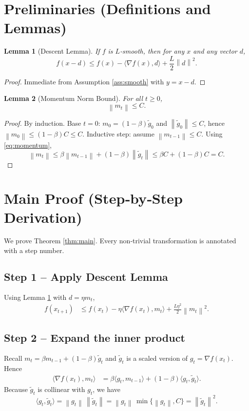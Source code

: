 \documentclass{article}
\newtheorem{lemma}{Lemma}
\newcommand{\norm}[1]{\left\lVert#1\right\rVert}
\newcommand{\grad}{\nabla}
\begin{document}
\section*{Preliminaries (Definitions and Lemmas)}
\begin{lemma}[Descent Lemma]\label{lem:descent}
If $f$ is $L$‑smooth, then for any $x$ and any vector $d$,
\[
f(x-d)\le f(x)-\langle \grad f(x),d\rangle+\frac{L}{2}\norm{d}^2 .
\]
\end{lemma}
\begin{proof}
Immediate from Assumption \ref{ass:smooth} with $y=x-d$.
\end{proof}
\begin{lemma}[Momentum Norm Bound]\label{lem:momentum}
For all $t\ge0$,
\[
\norm{m_t}\le C .
\]
\end{lemma}
\begin{proof}
By induction. Base $t=0$: $m_0=(1-\beta)\tilde g_0$ and $\norm{\tilde g_0}\le C$, hence $\norm{m_0}\le (1-\beta)C\le C$.  
Inductive step: assume $\norm{m_{t-1}}\le C$. Using \eqref{eq:momentum},
\[
\norm{m_t}\le \beta\norm{m_{t-1}}+(1-\beta)\norm{\tilde g_t}
\le \beta C+(1-\beta)C = C .
\]
\end{proof}

\section*{Main Proof (Step‑by‑Step Derivation)}
We prove Theorem \ref{thm:main}. Every non‑trivial transformation is annotated with a step number.

\subsection*{Step 1 – Apply Descent Lemma}
Using Lemma \ref{lem:descent} with $d=\eta m_t$,
\begin{align}
    f(x_{t+1})
    &\le f(x_t)-\eta\langle \grad f(x_t),m_t\rangle
          +\frac{L\eta^2}{2}\norm{m_t}^2 . \tag{1}
\end{align}

\subsection*{Step 2 – Expand the inner product}
Recall $m_t=\beta m_{t-1}+(1-\beta)\tilde g_t$ and $\tilde g_t$ is a scaled version of $g_t=\grad f(x_t)$. Hence
\begin{align}
    \langle \grad f(x_t),m_t\rangle
    &=\beta\langle g_t,m_{t-1}\rangle+(1-\beta)\langle g_t,\tilde g_t\rangle . \tag{2}
\end{align}
Because $\tilde g_t$ is collinear with $g_t$, we have 
\[
\langle g_t,\tilde g_t\rangle = \norm{g_t}\,\norm{\tilde g_t}
   = \norm{g_t}\,\min\{\norm{g_t},C\}
   = \norm{\tilde g_t}^2 . \tag{3}
\]
\end{document}
